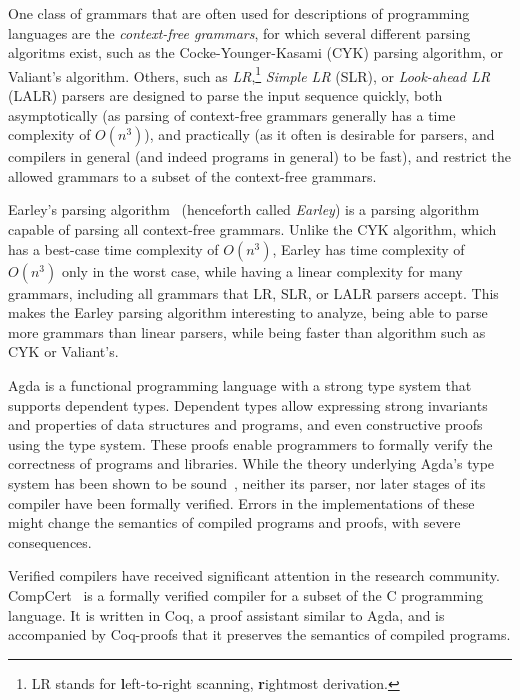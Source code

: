	One class of grammars that are often used for descriptions of programming
	languages are the \emph{context-free grammars}, for which several different
	parsing algoritms exist, such as the Cocke-Younger-Kasami (CYK) parsing algorithm, or Valiant's
	algorithm. Others, such as \emph{LR},\footnote{LR stands for
          \textbf{l}eft-to-right scanning, \textbf{r}ightmost
          derivation.}
        \emph{Simple LR} (SLR), or \emph{Look-ahead LR} (LALR) parsers are designed to
	parse the input sequence quickly, both asymptotically (as parsing of
	context-free grammars generally has a time complexity of $O(n^3)$), and
	practically (as it often is desirable for parsers, and compilers in
	general (and indeed programs in general) to be fast), and restrict the
	allowed grammars to a subset of the context-free
        grammars.

	Earley's parsing algorithm~\cite{Earley} (henceforth called
        \emph{Earley})
        is a parsing algorithm capable
	of parsing all context-free grammars. Unlike the CYK algorithm, which has a
	best-case time complexity of $O(n^3)$, Earley has time complexity
	of $O(n^3)$ only in the worst case,
        while having a linear complexity for many
	grammars, including all grammars that LR, SLR, or LALR parsers accept. This
	makes the Earley parsing algorithm interesting to analyze, being able to
	parse more grammars than linear parsers,
        while being faster than algorithm
	such as CYK or Valiant's. 

	Agda is a functional programming language with a strong type system that
	supports dependent types. Dependent types allow expressing strong
	invariants and properties of data structures and programs, and even
	constructive proofs using the type system. These proofs enable programmers
	to formally verify the correctness of programs and libraries. While the
	theory underlying Agda's type system has been shown to be sound~\cite{?},
	neither its parser, nor later stages of its compiler have been formally
	verified. Errors in the implementations of these might change the semantics
	of compiled programs and proofs, with severe consequences.

	Verified compilers have received significant attention in the research
	community. CompCert~\cite{Leroy} is a formally verified compiler for a
	subset of the C programming language. It is written in Coq, a proof
	assistant similar to Agda, and is accompanied by Coq-proofs that it
	preserves the semantics of compiled programs.

